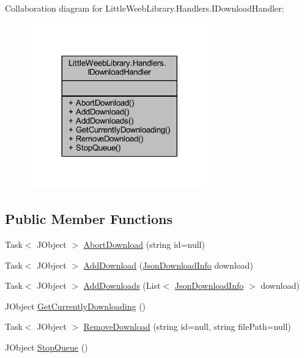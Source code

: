 Collaboration diagram for Little\+Weeb\+Library.\+Handlers.\+I\+Download\+Handler\+:\nopagebreak
\begin{figure}[H]
\begin{center}
\leavevmode
\includegraphics[width=221pt]{interface_little_weeb_library_1_1_handlers_1_1_i_download_handler__coll__graph}
\end{center}
\end{figure}
\subsection*{Public Member Functions}
\begin{DoxyCompactItemize}
\item 
Task$<$ J\+Object $>$ \mbox{\hyperlink{interface_little_weeb_library_1_1_handlers_1_1_i_download_handler_ad0282431f67c1c1b27ae85ec4430d547}{Abort\+Download}} (string id=null)
\item 
Task$<$ J\+Object $>$ \mbox{\hyperlink{interface_little_weeb_library_1_1_handlers_1_1_i_download_handler_aa3c1ffac97fec47757494e14b5ade3d6}{Add\+Download}} (\mbox{\hyperlink{class_little_weeb_library_1_1_models_1_1_json_download_info}{Json\+Download\+Info}} download)
\item 
Task$<$ J\+Object $>$ \mbox{\hyperlink{interface_little_weeb_library_1_1_handlers_1_1_i_download_handler_a615c539f5946719ae2ef4f856db91430}{Add\+Downloads}} (List$<$ \mbox{\hyperlink{class_little_weeb_library_1_1_models_1_1_json_download_info}{Json\+Download\+Info}} $>$ download)
\item 
J\+Object \mbox{\hyperlink{interface_little_weeb_library_1_1_handlers_1_1_i_download_handler_aa0c6f62ad21ef6fb638314101f4357ec}{Get\+Currently\+Downloading}} ()
\item 
Task$<$ J\+Object $>$ \mbox{\hyperlink{interface_little_weeb_library_1_1_handlers_1_1_i_download_handler_aca5dc8dc1965f09d2a5860f9297ddb26}{Remove\+Download}} (string id=null, string file\+Path=null)
\item 
J\+Object \mbox{\hyperlink{interface_little_weeb_library_1_1_handlers_1_1_i_download_handler_a7cc8a36cbac3bcfb4e9761fae2c5ac53}{Stop\+Queue}} ()
\end{DoxyCompactItemize}
